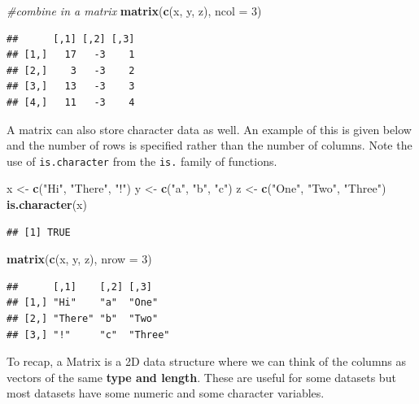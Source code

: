 \documentclass[
]{book}
\newenvironment{Shaded}{\begin{snugshade}}{\end{snugshade}}
\newcommand{\CommentTok}[1]{\textcolor[rgb]{0.56,0.35,0.01}{\textit{#1}}}
\newcommand{\DataTypeTok}[1]{\textcolor[rgb]{0.13,0.29,0.53}{#1}}
\newcommand{\DecValTok}[1]{\textcolor[rgb]{0.00,0.00,0.81}{#1}}
\newcommand{\KeywordTok}[1]{\textcolor[rgb]{0.13,0.29,0.53}{\textbf{#1}}}
\newcommand{\NormalTok}[1]{#1}
\newcommand{\StringTok}[1]{\textcolor[rgb]{0.31,0.60,0.02}{#1}}
\theoremstyle{definition}
\theoremstyle{definition}
\theoremstyle{definition}
\theoremstyle{remark}
\begin{document}
\begin{Shaded}
\begin{Highlighting}[]
\CommentTok{#combine in a matrix}
\KeywordTok{matrix}\NormalTok{(}\KeywordTok{c}\NormalTok{(x, y, z), }\DataTypeTok{ncol =} \DecValTok{3}\NormalTok{)}
\end{Highlighting}
\end{Shaded}

\begin{verbatim}
##      [,1] [,2] [,3]
## [1,]   17   -3    1
## [2,]    3   -3    2
## [3,]   13   -3    3
## [4,]   11   -3    4
\end{verbatim}

A matrix can also store character data as well. An example of this is given below and the number of rows is specified rather than the number of columns. Note the use of \texttt{is.character} from the \texttt{is.} family of functions.

\begin{Shaded}
\begin{Highlighting}[]
\NormalTok{x <-}\StringTok{ }\KeywordTok{c}\NormalTok{(}\StringTok{"Hi"}\NormalTok{, }\StringTok{"There"}\NormalTok{, }\StringTok{"!"}\NormalTok{)}
\NormalTok{y <-}\StringTok{ }\KeywordTok{c}\NormalTok{(}\StringTok{"a"}\NormalTok{, }\StringTok{"b"}\NormalTok{, }\StringTok{"c"}\NormalTok{)}
\NormalTok{z <-}\StringTok{ }\KeywordTok{c}\NormalTok{(}\StringTok{"One"}\NormalTok{, }\StringTok{"Two"}\NormalTok{, }\StringTok{"Three"}\NormalTok{)}
\KeywordTok{is.character}\NormalTok{(x)}
\end{Highlighting}
\end{Shaded}

\begin{verbatim}
## [1] TRUE
\end{verbatim}

\begin{Shaded}
\begin{Highlighting}[]
\KeywordTok{matrix}\NormalTok{(}\KeywordTok{c}\NormalTok{(x, y, z), }\DataTypeTok{nrow =} \DecValTok{3}\NormalTok{)}
\end{Highlighting}
\end{Shaded}

\begin{verbatim}
##      [,1]    [,2] [,3]   
## [1,] "Hi"    "a"  "One"  
## [2,] "There" "b"  "Two"  
## [3,] "!"     "c"  "Three"
\end{verbatim}

To recap, a Matrix is a 2D data structure where we can think of the columns as vectors of the same \textbf{type and length}. These are useful for some datasets but most datasets have some numeric and some character variables.
\end{document}
